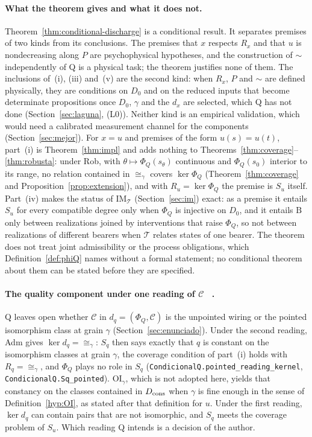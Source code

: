 \paragraph{What the theorem gives and what it does not.} Theorem~\ref{thm:conditional-discharge} is a conditional result. It separates premises of two kinds from its conclusions. The premises that $x$ respects $R_x$ and that $u$ is nondecreasing along $P$ are psychophysical hypotheses, and the construction of $\sim$ independently of Q is a physical task; the theorem justifies none of them. The inclusions of~(i), (iii) and~(v) are the second kind: when $R_x$, $P$ and $\sim$ are defined physically, they are conditions on $D_0$ and on the reduced inputs that become determinate propositions once $D_0$, $\gamma$ and the $d_x$ are selected, which Q has not done (Section~\ref{sec:laguna}, (L0)). Neither kind is an empirical validation, which would need a calibrated measurement channel for the components (Section~\ref{sec:mejor}). For $x=u$ and premises of the form $u(s)=u(t)$, part~(i) is Theorem~\ref{thm:impl} and adds nothing to Theorems~\ref{thm:coverage}--\ref{thm:robusta}: under Rob, with $\theta\mapsto\Phi_Q(s_\theta)$ continuous and $\Phi_Q(s_0)$ interior to its range, no relation contained in ${\cong_\gamma}$ covers $\ker\Phi_Q$ (Theorem~\ref{thm:coverage} and Proposition~\ref{prop:extension}), and with $R_u=\ker\Phi_Q$ the premise is $S_u$ itself. Part~(iv) makes the status of $\mathrm{IM}_{\mathcal T}$ (Section~\ref{sec:im}) exact: as a premise it entails $S_u$ for every compatible degree only when $\Phi_Q$ is injective on $D_0$, and it entails $\mathrm B$ only between realizations joined by interventions that raise $\Phi_Q$, so not between realizations of different bearers when $\mathcal T$ relates states of one bearer. The theorem does not treat joint admissibility or the process obligations, which Definition~\ref{def:phiQ} names without a formal statement; no conditional theorem about them can be stated before they are specified.

\paragraph{The quality component under one reading of $\mathcal C$ \stA\ \stL.} Q leaves open whether $\mathcal C$ in $d_q=(\Phi_Q,\mathcal C)$ is the unpointed wiring or the pointed isomorphism class at grain $\gamma$ (Section~\ref{sec:enunciado}). Under the second reading, Adm gives $\ker d_q={\cong_\gamma}$: $S_q$ then says exactly that $q$ is constant on the isomorphism classes at grain $\gamma$, the coverage condition of part~(i) holds with $R_q={\cong_\gamma}$, and $\Phi_Q$ plays no role in $S_q$ (\texttt{CondicionalQ.\allowbreak pointed\_reading\_kernel}, \texttt{CondicionalQ.\allowbreak Sq\_pointed}). OI$_\gamma$, which is not adopted here, yields that constancy on the classes contained in $D_{\rm cons}$ when $\gamma$ is fine enough in the sense of Definition~\ref{hyp:OI}, as stated after that definition for $u$. Under the first reading, $\ker d_q$ can contain pairs that are not isomorphic, and $S_q$ meets the coverage problem of $S_u$. Which reading Q intends is a decision of the author.
